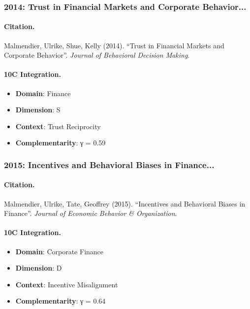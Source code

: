 \subsubsection{2014: Trust in Financial Markets and Corporate Behavior...}

\paragraph{Citation.}
Malmendier, Ulrike, Shue, Kelly (2014). ``Trust in Financial Markets and Corporate Behavior''. \textit{Journal of Behavioral Decision Making}.

\paragraph{10C Integration.}
\begin{itemize}[nosep]
  \item \textbf{Domain}: Finance
  \item \textbf{Dimension}: S
  \item \textbf{Context}: Trust Reciprocity
  \item \textbf{Complementarity}: γ = 0.59
\end{itemize}


\subsubsection{2015: Incentives and Behavioral Biases in Finance...}

\paragraph{Citation.}
Malmendier, Ulrike, Tate, Geoffrey (2015). ``Incentives and Behavioral Biases in Finance''. \textit{Journal of Economic Behavior & Organization}.

\paragraph{10C Integration.}
\begin{itemize}[nosep]
  \item \textbf{Domain}: Corporate Finance
  \item \textbf{Dimension}: D
  \item \textbf{Context}: Incentive Misalignment
  \item \textbf{Complementarity}: γ = 0.64
\end{itemize}


